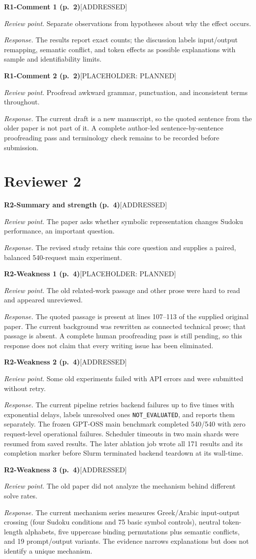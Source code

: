\documentclass[10pt,a4paper]{article}
\newcommand{\Done}{\textcolor{done}{\textsf{[ADDRESSED]}}}
\newcommand{\Planned}{\textcolor{pending}{\textsf{[PLACEHOLDER: PLANNED]}}}
\newcommand{\itemresponse}[4]{%
  \Needspace{5\baselineskip}%
  \par\vspace{0.65\baselineskip}%
  \noindent\textbf{#1}\quad #2\par
  \noindent\emph{Review point.} #3\par
  \noindent\emph{Response.} #4\par
}
\begin{document}
\itemresponse{R1-Comment 1 (p.~2)}{\Done}{Separate observations from hypotheses about why the effect occurs.}{The results report exact counts; the discussion labels input/output remapping, semantic conflict, and token effects as possible explanations with sample and identifiability limits.}

\itemresponse{R1-Comment 2 (p.~2)}{\Planned}{Proofread awkward grammar, punctuation, and inconsistent terms throughout.}{The current draft is a new manuscript, so the quoted sentence from the older paper is not part of it. A complete author-led sentence-by-sentence proofreading pass and terminology check remains to be recorded before submission.}

\section*{Reviewer 2}

\itemresponse{R2-Summary and strength (p.~4)}{\Done}{The paper asks whether symbolic representation changes Sudoku performance, an important question.}{The revised study retains this core question and supplies a paired, balanced 540-request main experiment.}

\itemresponse{R2-Weakness 1 (p.~4)}{\Planned}{The old related-work passage and other prose were hard to read and appeared unreviewed.}{The quoted passage is present at lines 107--113 of the supplied original paper. The current background was rewritten as connected technical prose; that passage is absent. A complete human proofreading pass is still pending, so this response does not claim that every writing issue has been eliminated.}

\itemresponse{R2-Weakness 2 (p.~4)}{\Done}{Some old experiments failed with API errors and were submitted without retry.}{The current pipeline retries backend failures up to five times with exponential delays, labels unresolved ones \texttt{NOT\_EVALUATED}, and reports them separately. The frozen GPT-OSS main benchmark completed 540/540 with zero request-level operational failures. Scheduler timeouts in two main shards were resumed from saved results. The later ablation job wrote all 171 results and its completion marker before Slurm terminated backend teardown at its wall-time.}

\itemresponse{R2-Weakness 3 (p.~4)}{\Done}{The old paper did not analyze the mechanism behind different solve rates.}{The current mechanism series measures Greek/Arabic input-output crossing (four Sudoku conditions and 75 basic symbol controls), neutral token-length alphabets, five uppercase binding permutations plus semantic conflicts, and 19 prompt/output variants. The evidence narrows explanations but does not identify a unique mechanism.}
\end{document}
